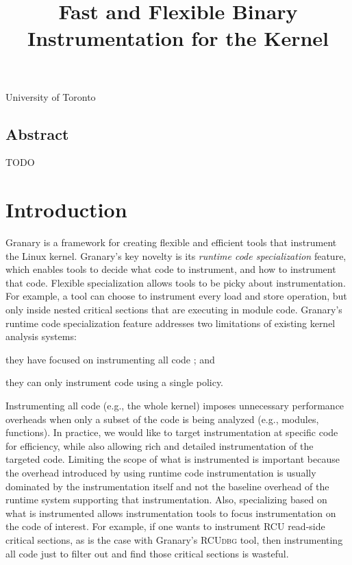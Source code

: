 \documentclass[preprint]{sigplanconf}
\newcommand{\toolname}[1]{{\scshape #1}}
\begin{document}
\title{Fast and Flexible Binary Instrumentation for the Kernel}

{University of Toronto}{}

\maketitle
\subsection*{Abstract}
TODO

\section{Introduction}\label{sec:intro}

Granary is a framework for creating flexible and efficient tools that instrument the Linux kernel. Granary's key novelty is its \emph{runtime code specialization} feature, which enables tools to decide what code to instrument, and how to instrument that code. Flexible specialization allows tools to be picky about instrumentation. For example, a tool can choose to instrument every load and store operation, but only inside nested critical sections that are executing in module code. Granary's runtime code specialization feature addresses two limitations of existing kernel analysis systems: \begin{inparaenum}[i)]
	\item they have focused on instrumenting all code \cite{DRK,btkernel,QEMU}; and
	\item they can only instrument code using a single policy.
\end{inparaenum}

Instrumenting all code (e.g., the whole kernel) imposes unnecessary performance overheads when only a subset of the code is being analyzed (e.g., modules, functions). In practice, we would like to target instrumentation at specific code for efficiency, while also allowing rich and detailed instrumentation of the targeted code. Limiting the scope of what is instrumented is  important because the overhead introduced by using runtime code instrumentation is usually dominated by the instrumentation itself and not the baseline overhead of the runtime system supporting that instrumentation. Also, specializing based on what is instrumented allows instrumentation tools to focus instrumentation on the code of interest. For example, if one wants to instrument RCU read-side critical sections, as is the case with Granary's \toolname{RCUdbg} tool, then instrumenting all code just to filter out and find those critical sections is wasteful.
\end{document}
